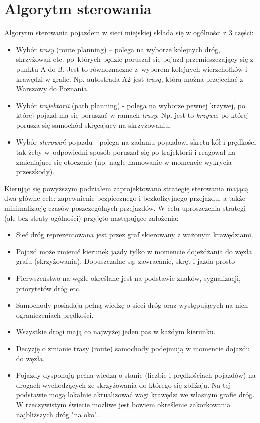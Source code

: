 \section{Algorytm sterowania}

Algorytm sterowania pojazdem w sieci miejskiej składa się w ogólności z 3 części:

\begin{itemize}
	\item 
	Wybór \textit{trasy} (route planning) -- polega na wyborze kolejnych dróg, skrzyżowań etc. po~których będzie poruszał się pojazd przemieszczający się z punktu A do B. Jest to równoznaczne z~wyborem kolejnych wierzchołków i krawędzi w grafie. Np. autostrada A2 jest \textit{trasą}, którą można przejechać z Warszawy do Poznania. 
	\item 
	Wybór \textit{trajektorii} (path planning) - polega na wyborze pewnej krzywej, po której pojazd ma się poruszać w ramach \textit{trasy}. Np. jest to \textit{krzywa}, po której porusza się samochód skręcający na skrzyżowaniu.
	\item 
	Wybór \textit{sterowań} pojazdu - polega na zadaniu pojazdowi skrętu kół i prędkości tak żeby w~odpowiedni sposób poruszał się po trajektorii i reagował na zmieniające się otoczenie (np. nagłe hamowanie w momencie wykrycia przeszkody).
\end{itemize}

Kierując się powyższym podziałem zaprojektowano strategię sterowania mającą dwa główne cele: zapewnienie bezpiecznego i bezkolizyjnego przejazdu, a także minimalizację czasów poszczególnych przejazdów. W celu uproszczenia strategi (ale bez straty ogólności) przyjęto następujące założenia:

\begin{itemize}
	\item 
	Sieć dróg reprezentowana jest przez graf skierowany z ważonym krawędziami.	
	\item 
	Pojazd może zmienić kierunek jazdy tylko w momencie dojeżdżania do węzła grafu (skrzyżowania). Dopuszczalne są: zawracanie, skręt i jazda prosto 
	\item 
	Pierwszeństwo na węźle określane jest na podstawie znaków, sygnalizacji, priorytetów dróg etc.
	\item 
	Samochody posiadają pełną wiedzę o sieci dróg oraz występujących na nich ograniczeniach prędkości.
	\item 
	Wszystkie drogi mają co najwyżej jeden pas w każdym kierunku.
	\item 
	Decyzję o zmianie trasy (route) samochody podejmują	w momencie dojazdu do węzła.
	\item
	Pojazdy dysponują pełna wiedzą o stanie (liczbie i prędkościach pojazdów) na drogach wychodzących ze skrzyżowania do którego się zbliżają. Na tej podstawie mogą lokalnie aktualizować wagi krawędzi we własnym grafie dróg. W rzeczywistym świecie możliwe jest bowiem określenie zakorkowania najbliższych dróg "na oko".
	
\end{itemize}

